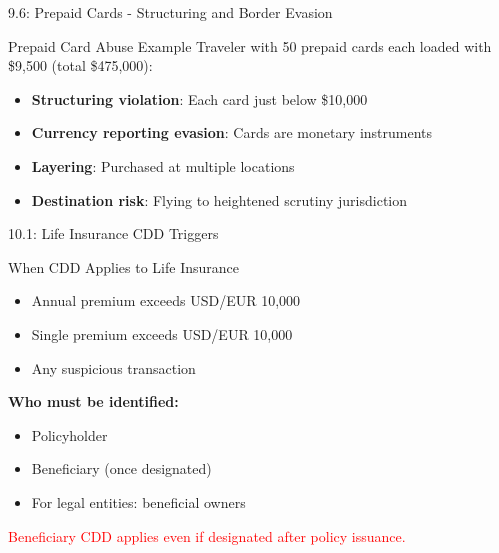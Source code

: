 \documentclass{beamer}
\begin{document}
	\begin{frame}{9.6: Prepaid Cards - Structuring and Border Evasion}
		\begin{block}{Prepaid Card Abuse Example}
			Traveler with 50 prepaid cards each loaded with \$9,500 (total \$475,000):
			\begin{itemize}
				\item \textbf{Structuring violation}: Each card just below \$10,000
				\item \textbf{Currency reporting evasion}: Cards are monetary instruments
				\item \textbf{Layering}: Purchased at multiple locations
				\item \textbf{Destination risk}: Flying to heightened scrutiny jurisdiction
			\end{itemize}
		\end{block}
	\end{frame}
	
	
	\begin{frame}{10.1: Life Insurance CDD Triggers}
		\begin{block}{When CDD Applies to Life Insurance}
			\begin{itemize}
				\item Annual premium exceeds USD/EUR 10,000
				\item Single premium exceeds USD/EUR 10,000
				\item Any suspicious transaction
			\end{itemize}
			\textbf{Who must be identified:}
			\begin{itemize}
				\item Policyholder
				\item Beneficiary (once designated)
				\item For legal entities: beneficial owners
			\end{itemize}
		\end{block}
		\textcolor{red}{Beneficiary CDD applies even if designated after policy issuance.}
	\end{frame}
	
\end{document}
